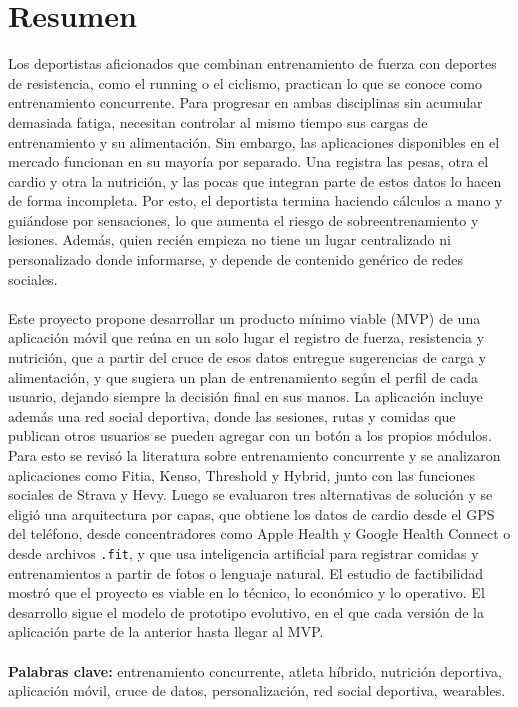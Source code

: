 \section*{Resumen}
Los deportistas aficionados que combinan entrenamiento de fuerza con deportes de resistencia, como el running o el ciclismo, practican lo que se conoce como entrenamiento concurrente. Para progresar en ambas disciplinas sin acumular demasiada fatiga, necesitan controlar al mismo tiempo sus cargas de entrenamiento y su alimentación. Sin embargo, las aplicaciones disponibles en el mercado funcionan en su mayoría por separado. Una registra las pesas, otra el cardio y otra la nutrición, y las pocas que integran parte de estos datos lo hacen de forma incompleta. Por esto, el deportista termina haciendo cálculos a mano y guiándose por sensaciones, lo que aumenta el riesgo de sobreentrenamiento y lesiones. Además, quien recién empieza no tiene un lugar centralizado ni personalizado donde informarse, y depende de contenido genérico de redes sociales.
\\\\
Este proyecto propone desarrollar un producto mínimo viable (MVP) de una aplicación móvil que reúna en un solo lugar el registro de fuerza, resistencia y nutrición, que a partir del cruce de esos datos entregue sugerencias de carga y alimentación, y que sugiera un plan de entrenamiento según el perfil de cada usuario, dejando siempre la decisión final en sus manos. La aplicación incluye además una red social deportiva, donde las sesiones, rutas y comidas que publican otros usuarios se pueden agregar con un botón a los propios módulos. Para esto se revisó la literatura sobre entrenamiento concurrente y se analizaron aplicaciones como Fitia, Kenso, Threshold y Hybrid, junto con las funciones sociales de Strava y Hevy. Luego se evaluaron tres alternativas de solución y se eligió una arquitectura por capas, que obtiene los datos de cardio desde el GPS del teléfono, desde concentradores como Apple Health y Google Health Connect o desde archivos \texttt{.fit}, y que usa inteligencia artificial para registrar comidas y entrenamientos a partir de fotos o lenguaje natural. El estudio de factibilidad mostró que el proyecto es viable en lo técnico, lo económico y lo operativo. El desarrollo sigue el modelo de prototipo evolutivo, en el que cada versión de la aplicación parte de la anterior hasta llegar al MVP.
\\\\
\textbf{Palabras clave:} entrenamiento concurrente, atleta híbrido, nutrición deportiva, aplicación móvil, cruce de datos, personalización, red social deportiva, wearables.
\newpage
